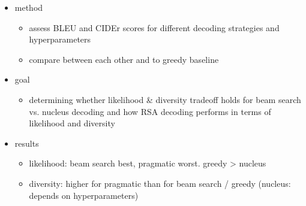 \documentclass[11pt,a4paper]{article}
\begin{document}
\begin{itemize}

\item method
	\begin{itemize}
	\item assess BLEU and CIDEr scores for different decoding strategies and hyperparameters
	\item compare between each other and to greedy baseline
	\end{itemize}

\item goal
	\begin{itemize}
	\item determining whether likelihood \& diversity tradeoff holds for beam search vs. nucleus decoding and how RSA decoding performs in terms of likelihood and diversity
	\end{itemize}

\item results
	\begin{itemize}
	\item likelihood: beam search best, pragmatic worst. greedy > nucleus
	\item diversity: higher for pragmatic than for beam search / greedy (nucleus: depends on hyperparameters)
	\end{itemize}

\end{itemize}







\end{document}
